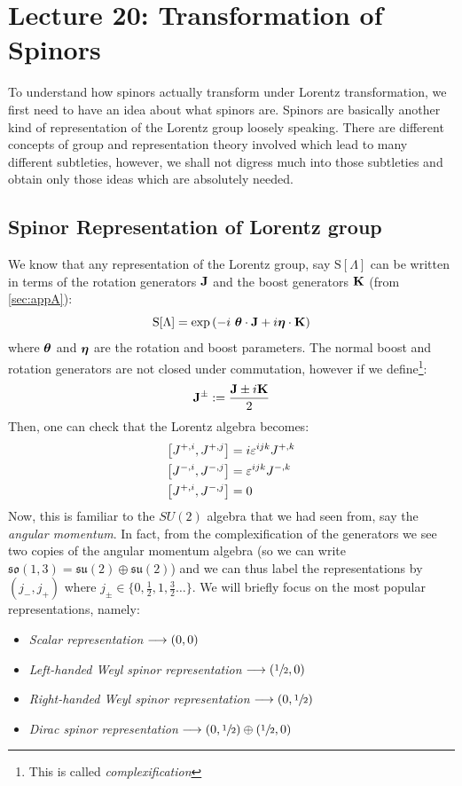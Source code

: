 \section*{Lecture 20: Transformation of Spinors}
To understand how spinors actually transform under Lorentz transformation, we first need to have an idea about what spinors are. Spinors are basically another kind of representation of the Lorentz group loosely speaking. There are different concepts of group and representation theory involved which lead to many different subtleties, however, we shall not digress much into those subtleties and obtain only those ideas which are absolutely needed.
\subsection{Spinor Representation of Lorentz group}
We know that any representation of the Lorentz group, say $\mathrm{S}[\Lambda]$ can be written in terms of the rotation generators $\vb{J}$ and the boost generators $\vb{K}$ (from \ref{sec:appA}):
$$\mathrm{S}[\Lambda] = \exp \qty(-i\ \boldsymbol{\theta}\cdot \vb{J} + i\boldsymbol{\eta}\cdot \vb{K})$$
where $\boldsymbol{\theta}$ and $\boldsymbol{\eta}$ are the rotation and boost parameters. The normal boost and rotation generators are not closed under commutation, however if we define\footnote{This is called \textit{complexification}}:
$$\vb{J}^{\pm} := \frac{\vb{J}\pm i \vb{K}}{2}$$
Then, one can check that the Lorentz algebra becomes:
\begin{align*}
    \left[ J^{+,i}, J^{+,j} \right]&=i\varepsilon^{ijk}J^{+,k}\\
    \left[ J^{-,i}, J^{-,j} \right]&=\varepsilon^{ijk}J^{-,k}\\
      \left[ J^{+,i}, J^{-,j} \right]&=0
\end{align*}
Now, this is familiar to the $SU(2)$ algebra that we had seen from, say the \textit{angular momentum}. In fact, from the complexification of the generators we see two copies of the angular momentum algebra (so we can write $\mathfrak{so}(1,3) = \mathfrak{su}(2) \oplus \mathfrak{su}(2) $) and we can thus label the representations by $(j_-, j_+)$ where $j_{\pm}\in \{0,\frac{1}{2}, 1, \frac{3}{2}\ldots\}$. We will briefly focus on the most popular representations, namely:
\begin{itemize}
    \item \textit{Scalar representation } $\longrightarrow \qty(0,0)$
     \item \textit{Left-handed Weyl spinor representation } $\longrightarrow \qty(\sfrac{1}{2},0)$
  \item \textit{Right-handed Weyl spinor representation } $\longrightarrow \qty(0,\sfrac{1}{2})$
  \item \textit{Dirac spinor representation } $\longrightarrow \qty(0,\sfrac{1}{2})\oplus \qty(\sfrac{1}{2},0)$
\end{itemize}
